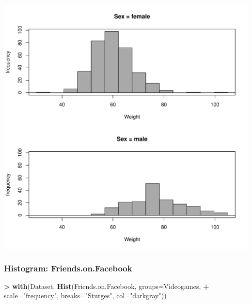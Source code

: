 \documentclass[
]{article}
\newenvironment{Shaded}{\begin{snugshade}}{\end{snugshade}}
\newcommand{\AttributeTok}[1]{\textcolor[rgb]{0.13,0.29,0.53}{#1}}
\newcommand{\FunctionTok}[1]{\textcolor[rgb]{0.13,0.29,0.53}{\textbf{#1}}}
\newcommand{\NormalTok}[1]{#1}
\newcommand{\SpecialCharTok}[1]{\textcolor[rgb]{0.81,0.36,0.00}{\textbf{#1}}}
\newcommand{\StringTok}[1]{\textcolor[rgb]{0.31,0.60,0.02}{#1}}
\begin{document}
\includegraphics[width=750px]{RcmdrMarkdown_files/figure-latex/unnamed-chunk-15-1}

\subsubsection{Histogram:
Friends.on.Facebook}\label{histogram-friends.on.facebook}

\begin{Shaded}
\begin{Highlighting}[]
\SpecialCharTok{\textgreater{}} \FunctionTok{with}\NormalTok{(Dataset, }\FunctionTok{Hist}\NormalTok{(Friends.on.Facebook, }\AttributeTok{groups=}\NormalTok{Videogames, }
\SpecialCharTok{+}   \AttributeTok{scale=}\StringTok{"frequency"}\NormalTok{, }\AttributeTok{breaks=}\StringTok{"Sturges"}\NormalTok{, }\AttributeTok{col=}\StringTok{"darkgray"}\NormalTok{))}
\end{Highlighting}
\end{Shaded}
\end{document}

